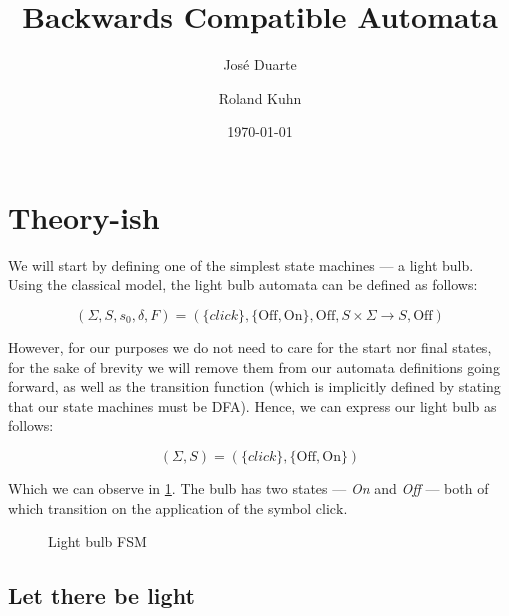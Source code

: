 \documentclass[a4paper]{article}
\begin{document}
\title{Backwards Compatible Automata}
\author{José Duarte \and Roland Kuhn}
\date{\today}
\maketitle

\section*{Theory-ish}

We will start by defining one of the simplest state machines — a light bulb.
Using the classical model, the light bulb automata can be defined as follows:

\begin{equation}
    (\Sigma, S, s_0, \delta, F) = (\{click\}, \{\text{Off}, \text{On}\}, \text{Off},S \times \Sigma \rightarrow S, \text{Off})
    \label{eq:fsm_long}
\end{equation}

However, for our purposes we do not need to care for the start nor final states,
for the sake of brevity we will remove them from our automata definitions going forward,
as well as the transition function (which is implicitly defined by stating that our state machines must be DFA).
Hence, we can express our light bulb as follows:

\begin{equation}
    (\Sigma, S) = (\{click\}, \{\text{Off}, \text{On}\})
    \label{eq:fsm_short}
\end{equation}

Which we can observe in \cref{fig:bulb_fsm}.
The bulb has two states — \emph{On} and \emph{Off} — both of which transition on the application of the symbol $\text{click}$.

\begin{figure}[ht]
    \centering
    \caption{Light bulb FSM}
    \label{fig:bulb_fsm}
\end{figure}

\subsection*{Let there be light}
\end{document}
